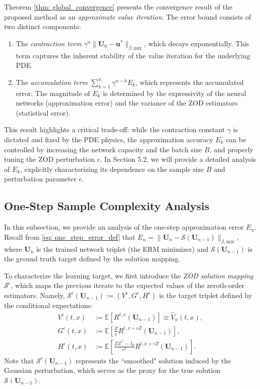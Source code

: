 \documentclass[twoside,11pt]{article}
\newcommand{\E}{\mathbb{E}}
\newcommand{\1}{\mathbf{1}}
\numberwithin{equation}{section}
\begin{document}
Theorem \ref{thm: global_convergence} presents the convergence result of the proposed method as an \textit{approximate value iteration}. The error bound consists of two distinct components:
\begin{enumerate}
    \item The {\it contraction term} $\gamma^n \|\mathbf{U}_0 - \mathbf{u}^*\|_{\beta, \text{mix}}$, which decays exponentially. This term captures  the inherent stability of the value iteration for the underlying PDE.
    \item The {\it accumulation term} $ \sum_{k=1}^n \gamma^{n-k} E_k$, which represents the accumulated error. The magnitude of $ E_k$ is determined by the expressivity of the neural networks (approximation error) and the variance of the ZOD estimators (statistical error).
\end{enumerate}
This result highlights a critical trade-off: while the contraction constant $\gamma$ is dictated and fixed by the PDE physics, the approximation accuracy $ E_k$ can be controlled by increasing the network capacity and the batch size $B$, and properly tuning the ZOD perturbation $\epsilon$. In Section 5.2, we will provide a detailed analysis of $E_k$, explicitly characterizing its dependence on the sample size $B$ and perturbation parameter $\epsilon$.



\subsection{One-Step Sample Complexity Analysis}

In this subsection, we provide an analysis of the one-step approximation error $E_{n}$. Recall from \eqref{eq: one_step_error_def} that $E_n = \|\mathbf{U}_n - \mathcal{S}(\mathbf{U}_{n-1})\|_{\beta, \text{mix}}$, where $\mathbf{U}_n$ is the trained network triplet (the ERM minimizer) and $\mathcal{S}(\mathbf{U}_{n-1})$ is the ground truth target defined by the solution mapping.


To characterize the learning target, we first introduce the \textit{ZOD solution mapping} $\mathcal{S}^\epsilon$, which maps the previous iterate to the expected values of the zeroth-order estimators. Namely,  $  \mathcal{S}^\epsilon(\mathbf{U}_{n-1}):= (V^\epsilon, G^\epsilon, H^\epsilon) $ is the target triplet defined by the conditional expectations:
\begin{align}
    V^\epsilon(t,x) &:= \E\left[ R^{t,x}(\mathbf{U}_{n-1}) \right] \equiv \hat{V}_n(t,x)
    , \label{eq: V_eps_def}\\
    G^\epsilon(t,x) &:= \E\left[ \frac{Z}{\epsilon} R^{t,x+\epsilon Z}(\mathbf{U}_{n-1}) \right], \label{eq: G_eps_def} \\
    H^\epsilon(t,x) &:= \E\left[ \frac{ZZ^\top - I_d}{\epsilon^2} R^{t,x+\epsilon Z}(\mathbf{U}_{n-1}) \right]. \label{eq: H_eps_def}
\end{align}
Note that $\mathcal{S}^\epsilon(\mathbf{U}_{n-1})$ represents the ``smoothed" solution induced by the Gaussian perturbation, which serves as the proxy for the true solution $\mathcal{S}(\mathbf{U}_{n-1})$.
\end{document}
